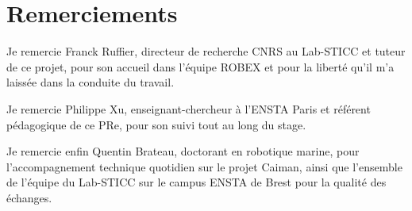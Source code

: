 \chapter*{Remerciements}

Je remercie Franck Ruffier, directeur de recherche CNRS au Lab-STICC et tuteur de ce projet, pour son accueil dans l'équipe ROBEX et pour la liberté qu'il m'a laissée dans la conduite du travail.

Je remercie Philippe Xu, enseignant-chercheur à l'ENSTA Paris et référent pédagogique de ce PRe, pour son suivi tout au long du stage.

Je remercie enfin Quentin Brateau, doctorant en robotique marine, pour l'accompagnement technique quotidien sur le projet Caiman, ainsi que l'ensemble de l'équipe du Lab-STICC sur le campus ENSTA de Brest pour la qualité des échanges.

\clearpage
